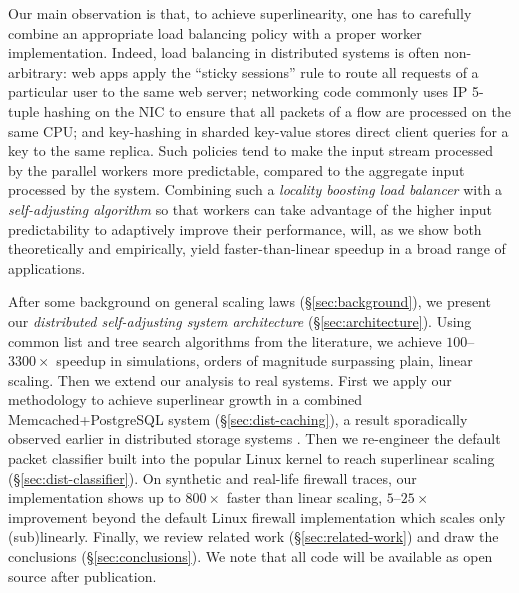Our main observation is that, to achieve superlinearity, one has to carefully combine an appropriate load balancing policy with a proper worker implementation. Indeed, load balancing in distributed systems is often non-arbitrary: web apps apply the ``sticky sessions'' rule to route all requests of a particular user to the same web server; %
networking code commonly uses IP 5-tuple hashing on the NIC to ensure that all packets of a flow are processed on the same CPU; %
and key-hashing in sharded key-value stores direct client queries for a key to the same replica. Such policies tend to make the input stream processed by the parallel workers more predictable, compared to the aggregate input processed by the system. Combining such a \emph{locality boosting load balancer} with a \emph{self-adjusting algorithm} so that workers can take advantage of the higher input predictability to adaptively improve their performance, will, as we show both theoretically and empirically, yield faster-than-linear speedup in a broad range of applications. %

After some background on general scaling laws (\S\ref{sec:background}), we present our \emph{distributed self-adjusting system architecture}  (\S\ref{sec:architecture}). Using common list and tree search algorithms from the literature, we achieve $100$--$3300\times$ speedup in simulations, orders of magnitude surpassing plain, linear scaling. Then we extend our analysis to real systems. First we apply our methodology to achieve superlinear growth in a combined Memcached+PostgreSQL system (\S\ref{sec:dist-caching}), a result sporadically observed earlier in distributed storage systems \cite{icsoft20, wikipedia}. Then we re-engineer the default packet classifier built into the popular Linux kernel to reach superlinear scaling (\S\ref{sec:dist-classifier}). On synthetic and real-life firewall traces, our implementation shows up to $800\times$ faster than linear scaling, $5$--$25\times$ improvement beyond the default Linux firewall implementation which scales only (sub)linearly. Finally, we review related work (\S\ref{sec:related-work}) and draw the conclusions (\S\ref{sec:conclusions}). We note that all code will be available as open source after publication.

